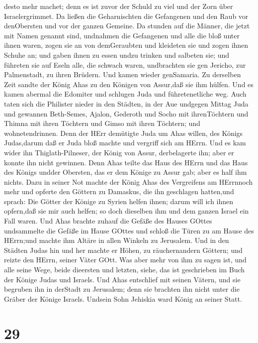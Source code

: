 desto mehr machet; denn es ist zuvor der Schuld zu viel und der Zorn
über Israelergrimmet.  Da ließen die Geharnischten die
Gefangenen und den Raub vor denObersten und vor der ganzen Gemeine.
 Da stunden auf die Männer, die jetzt mit Namen genannt
sind, undnahmen die Gefangenen und alle die bloß unter ihnen waren,
zogen sie an von demGeraubten und kleideten sie und zogen ihnen Schuhe
an; und gaben ihnen zu essen undzu trinken und salbeten sie; und
führeten sie auf Eseln alle, die schwach waren, undbrachten sie gen
Jericho, zur Palmenstadt, zu ihren Brüdern. Und kamen wieder genSamaria.
 Zu derselben Zeit sandte der König Ahas zu den Königen von
Assur,daß sie ihm hülfen.  Und es kamen abermal die
Edomiter und schlugen Juda und führetenetliche weg.  Auch
taten sich die Philister nieder in den Städten, in der Aue undgegen
Mittag Juda und gewannen Beth-Semes, Ajalon, Gederoth und Socho mit
ihrenTöchtern und Thimna mit ihren Töchtern und Gimso mit ihren
Töchtern; und wohnetendrinnen.  Denn der HErr demütigte
Juda um Ahas willen, des Königs Judas,darum daß er Juda bloß machte und
vergriff sich am HErrn.  Und es kam wider ihn
Thiglath-Pilneser, der König von Assur, derbelagerte ihn; aber er konnte
ihn nicht gewinnen.  Denn Ahas teilte das Haus des HErrn
und das Haus des Königs undder Obersten, das er dem Könige zu Assur gab;
aber es half ihm nichts.  Dazu in seiner Not machte der
König Ahas des Vergreifens am HErrnnoch mehr  und opferte
den Göttern zu Damaskus, die ihn geschlagen hatten,und sprach: Die
Götter der Könige zu Syrien helfen ihnen; darum will ich ihnen
opfern,daß sie mir auch helfen; so doch dieselben ihm und dem ganzen
Israel ein Fall waren.  Und Ahas brachte zuhauf die Gefäße
des Hauses GOttes undsammelte die Gefäße im Hause GOttes und schloß die
Türen zu am Hause des HErrn;und machte ihm Altäre in allen Winkeln zu
Jerusalem.  Und in den Städten Judas hin und her machte er
Höhen, zu räuchernandern Göttern; und reizte den HErrn, seiner Väter
GOtt.  Was aber mehr von ihm zu sagen ist, und alle seine
Wege, beide dieersten und letzten, siehe, das ist geschrieben im Buch
der Könige Judas und Israels.  Und Ahas entschlief mit
seinen Vätern, und sie begruben ihn in derStadt zu Jerusalem; denn sie
brachten ihn nicht unter die Gräber der Könige Israels. Undsein Sohn
Jehiskia ward König an seiner Statt.

\hypertarget{section-28}{%
\section{29}\label{section-28}}

